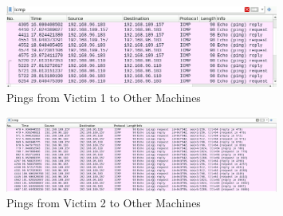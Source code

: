 \begin{figure}[H]
    \centering
    \includegraphics[width=0.8\textwidth]{img/level1/level1-192-168-96-183.png}
    \caption{Pings from Victim 1 to Other Machines}\label{fig:PingVictim1}
\end{figure}

\begin{figure}[H]
    \centering
    \includegraphics[width=0.8\textwidth]{img/level1/level1-192-168-109-157.png}
    \caption{Pings from Victim 2 to Other Machines}\label{fig:PingVictim2}
\end{figure}